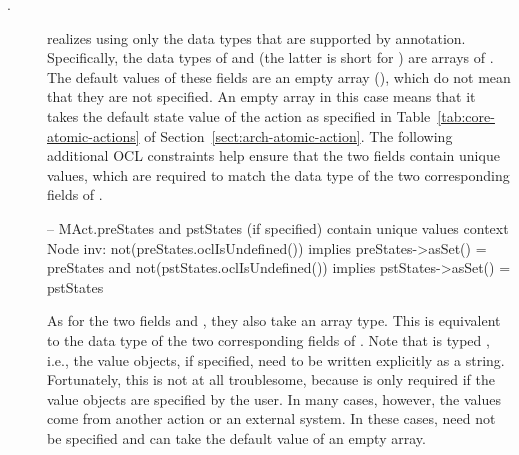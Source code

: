\begin{description}
\item[.]  realizes  using only the data types that are supported by annotation. Specifically, the data types of  and  (the latter is short for ) are arrays of . The default values of these fields are an empty array (\code{[]}), which do not mean that they are not specified. An empty array in this case means that it takes the default state value of the action as specified in Table~\ref{tab:core-atomic-actions} of Section~\ref{sect:arch-atomic-action}.
The following additional OCL constraints help ensure that the two fields contain unique values, which are required to match the  data type of the two corresponding fields of .
\begin{lstrule}
-- MAct.preStates and pstStates (if specified) contain unique values
context Node inv:
  not(preStates.oclIsUndefined()) implies preStates->asSet() = preStates and 
  not(pstStates.oclIsUndefined()) implies pstStates->asSet() = pstStates
\end{lstrule}

As for the two fields  and , they also take an array type. This is equivalent to the  data type of the two corresponding fields of . Note that  is typed , i.e., the value objects, if specified, need to be written explicitly as a string. Fortunately, this is not at all troublesome, because  is only required if the value objects are specified by the user. In many cases, however, the values come from another action or an external system. In these cases,  need not be specified and can take the default value of an empty array.


\end{description}
